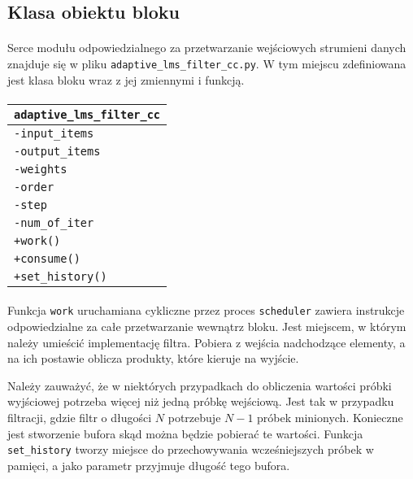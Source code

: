 \subsection{Klasa obiektu bloku}
\paragraph{}
Serce modułu odpowiedzialnego za przetwarzanie wejściowych strumieni danych znajduje się w pliku  \texttt{adaptive\_lms\_filter\_cc.py}. W tym miejscu zdefiniowana jest klasa bloku wraz z jej zmiennymi i funkcją.

\paragraph{}
\begin{tabular}{|l|} \hline
\texttt{adaptive\_lms\_filter\_cc} \\
\hline
\texttt{-input\_items} \\
\texttt{-output\_items} \\
\texttt{-weights} \\
\texttt{-order} \\
\texttt{-step} \\
\texttt{-num\_of\_iter} \\
\hline
\texttt{+work()} \\
\texttt{+consume()} \\
\texttt{+set\_history()} \\
\hline
\end{tabular}

\paragraph{}
Funkcja \texttt{work} uruchamiana cykliczne przez proces \texttt{scheduler} zawiera instrukcje odpowiedzialne za całe przetwarzanie wewnątrz bloku. 
Jest miejscem, w którym należy umieścić implementację filtra. 
Pobiera z wejścia nadchodzące elementy, a na ich postawie oblicza produkty, które kieruje na wyjście.

Należy zauważyć, że w niektórych przypadkach do obliczenia wartości próbki wyjściowej potrzeba więcej niż jedną próbkę wejściową. 
Jest tak w przypadku filtracji, gdzie filtr o długości $N$ potrzebuje $N-1$ próbek minionych. 
Konieczne jest stworzenie bufora skąd można będzie pobierać te wartości. 
Funkcja \texttt{set\_history} tworzy miejsce do przechowywania wcześniejszych próbek w pamięci, a jako parametr przyjmuje długość tego bufora.

